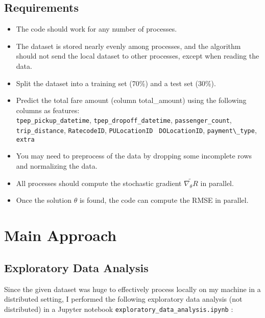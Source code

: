 \documentclass{article}
\begin{document}
\subsection{Requirements}
\begin{itemize}
  \item The code should work for any number of processes.
  \item The dataset is stored nearly evenly among processes, and the algorithm should not send the local dataset to other processes, except when reading the data.
  \item Split the dataset into a training set (70\%) and a test set (30\%).
  \item Predict the total fare amount (column total\_amount) using the following columns as features: \\ \verb|tpep_pickup_datetime|, \verb|tpep_dropoff_datetime|, \verb|passenger_count|, \verb|trip_distance|, \verb|RatecodeID|, \verb|PULocationID|
    \verb| DOLocationID|, \verb |payment\_type|, \verb|extra|
  \item You may need to preprocess of the data by dropping some incomplete rows and normalizing the data.

  \item All processes should compute the stochastic gradient $\widetilde{\nabla_{\theta} R}$ in parallel.
  \item Once the solution $\theta$ is found, the code can compute the RMSE in parallel.
\end{itemize}

\newpage
\section{Main Approach}
\subsection{Exploratory Data Analysis}
Since the given dataset was huge to effectively process locally on my machine in a distributed setting, I performed the following exploratory data analysis (not distributed) in a Jupyter notebook \verb|exploratory_data_analysis.ipynb| :
\end{document}
